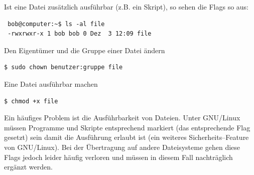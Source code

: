 Ist eine Datei zusätzlich ausführbar (z.B. ein Skript), so sehen die Flags so aus:
\begin{lstlisting}
 bob@computer:~$ ls -al file
 -rwxrwxr-x 1 bob bob 0 Dez  3 12:09 file
\end{lstlisting}

\begin{multicols}{2}
Den Eigentümer und die Gruppe einer Datei ändern
\begin{lstlisting}
$ sudo chown benutzer:gruppe file
\end{lstlisting}
\columnbreak
Eine Datei ausführbar machen
\begin{lstlisting}
$ chmod +x file
\end{lstlisting}
\end{multicols}

Ein häufiges Problem ist die Ausführbarkeit von Dateien. Unter GNU/Linux müssen Programme und Skripte entsprechend markiert (das entsprechende Flag gesetzt) sein damit die Ausführung erlaubt ist (ein weiteres Sicherheits--Feature von GNU/Linux). Bei der Übertragung auf andere Dateisysteme gehen diese Flags jedoch leider häufig verloren und müssen in diesem Fall nachträglich ergänzt werden.